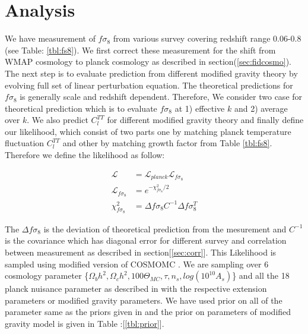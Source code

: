 
\section{Analysis} 
\label{sec:analysis} 

We have measurement of $f\sigma_8$ from various survey covering redshift range 0.06-0.8 (see Table: \ref{tbl:fs8}). We first correct these measurement for the shift from WMAP cosmology to planck cosmology as described in section(\ref{sec:fidcosmo}). The next step is to evaluate prediction from different modified gravity theory by evolving full set of linear perturbation equation. The theoretical predictions for $f\sigma_8$ is generally scale and redshift dependent. Therefore, We consider two case for theoretical prediction which is to evaluate $f\sigma_8$ at 1) effective $k$ and  2) average over $k$. We also predict $C_l^{TT}$ for different modified gravity theory and finally define our likelihood, which consist of two parts one  by matching planck temperature fluctuation $C_l^{TT}$ and other by matching growth factor from Table \ref{tbl:fs8}. Therefore we define the likelihood as follow:

\begin{align}
\mathcal{L} &= \mathcal{L}_{planck} \mathcal{L}_{f\sigma_8} \\
\mathcal{L}_{f\sigma_8} &= e^ {-\chi^2_{f\sigma_8}/2} \\
\chi^2_{f\sigma_8} &= \Delta f \sigma_8 C^{-1} \Delta f\sigma_8^{T}
\end{align}

The $\Delta f\sigma_8$ is the deviation of theoretical prediction from the mesurement and $C^{-1}$ is the covariance which has diagonal error for different survey and correlation between measurement as described in section[\ref{sec:corr}]. This Likelihood is sampled using modified version of COSMOMC \citep{cosmomc,Hojjati2011}. We are sampling over 6 cosmology parameter \{$\Omega_b h^2, \Omega_c h^2, 100\Theta_{MC} ,\tau, n_s, log(10^{10} A_s) $\} and all the 18 planck nuisance parameter as described in \citet{Planck2013} with the respective extension parameters or modified gravity parameters. We have used prior on all of the parameter same as the priors given in \citet{Planck2013} and the prior on parameters of modified gravity model is given in Table :[\ref{tbl:prior}].